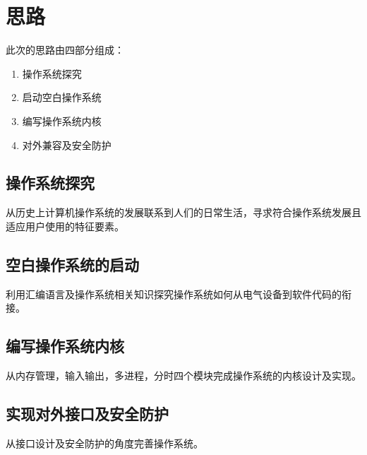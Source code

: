 \chapter{思路}

此次的思路由四部分组成：
\begin{enumerate}
    \item 操作系统探究
    \item 启动空白操作系统
    \item 编写操作系统内核
    \item 对外兼容及安全防护
    \end{enumerate}

\section{操作系统探究}
从历史上计算机操作系统的发展联系到人们的日常生活，寻求符合操作系统发展且适应用户使用的特征要素。

\section{空白操作系统的启动}
利用汇编语言及操作系统相关知识探究操作系统如何从电气设备到软件代码的衔接。

\section{编写操作系统内核}
从内存管理，输入输出，多进程，分时四个模块完成操作系统的内核设计及实现。

\section{实现对外接口及安全防护}
从接口设计及安全防护的角度完善操作系统。